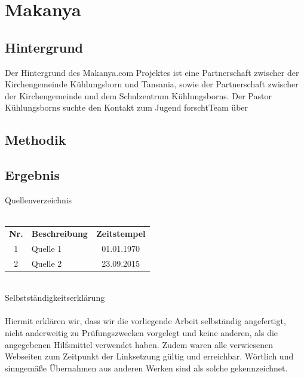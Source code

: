 \documentclass[a4paper,oneside,10pt,titlepage]{article}
\newcommand{\jf}{Jugend forscht}
\begin{document}
\section{Makanya}
\subsection{Hintergrund}
Der Hintergrund des Makanya.com Projektes ist eine Partnerschaft zwischer der Kirchengemeinde Kühlungsborn und Tansania, sowie der Partnerschaft zwischer der Kirchengemeinde und dem Schulzentrum Kühlungsborns. Der Pastor Kühlungsborns %
suchte den Kontakt zum \jf Team über 
\subsection{Methodik}
\subsection{Ergebnis}

\newpage
\Large{Quellenverzeichnis}\\
\\
\small
\begin{tabular}{clc}
\textbf{Nr.} & \textbf{Beschreibung} & \textbf{Zeitstempel} \\
1 & Quelle 1 & 01.01.1970 \\
2 & Quelle 2 & 23.09.2015 \\
\end{tabular} 
\\

\newpage
\Large{Selbstständigkeitserklärung}\\
\\
\small Hiermit erklären wir, dass wir die vorliegende Arbeit selbständig angefertigt, nicht anderweitig zu Prüfungszwecken vorgelegt und keine anderen, als die angegebenen Hilfsmittel verwendet haben. Zudem waren alle verwiesenen Webseiten zum Zeitpunkt der Linksetzung gültig und erreichbar. Wörtlich und sinngemäße Übernahmen aus anderen Werken sind als solche gekennzeichnet.
\\
\end{document}
